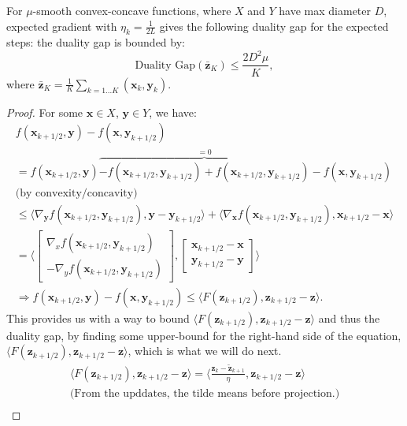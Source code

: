 \begin{proposition}
    \label{prop:proj_eg_smooth_convex_concave}
    For $\mu$-smooth convex-concave functions, where $X$ and $Y$ have max diameter $D$, expected gradient with $\eta_k = \frac{1}{2L}$ gives the following duality gap for the expected steps:
    the duality gap is bounded by:
    \[
        \text{Duality Gap}(\bar{\bm{z}}_K) \leq \frac{2 D^2 \mu}{K},
    \]
    where $\bar{\bm{z}}_K = \frac{1}{K} \sum_{k = 1...K} (\bm{x}_k,\bm{y}_k)$.
\end{proposition}


\begin{proof}
For some $\bm{x} \in X$, $\bm{y} \in Y$, we have:
\begin{align*}
    f(\bm{x}_{k+1/2},\bm{y}) - f(\bm{x},\bm{y}_{k+1/2}) \\
    = f(\bm{x}_{k+1/2},\bm{y}) \overbrace{- f(\bm{x}_{k+1/2},\bm{y}_{k+1/2}) + f(\bm{x}_{k+1/2},\bm{y}_{k+1/2})}^{=0}  - f(\bm{x},\bm{y}_{k+1/2}) \\
    \text{(by convexity/concavity)} \\
    \leq \langle \nabla_{\bm{y}} f(\bm{x}_{k+1/2},\bm{y}_{k+1/2}),\bm{y}- \bm{y}_{k+1/2} \rangle +
    \langle \nabla_{\bm{x}} f(\bm{x}_{k+1/2},\bm{y}_{k+1/2}), \bm{x}_{k+1/2} - \bm{x}\rangle  \\
    = 
    \Bigg \langle  
    \begin{bmatrix}
        \nabla_x f(\bm{x}_{k+1/2},\bm{y}_{k+1/2}) \\
        -\nabla_y f(\bm{x}_{k+1/2},\bm{y}_{k+1/2})
    \end{bmatrix} ,
    \begin{bmatrix}
        \bm{x}_{k+1/2} -\bm{x} \\ 
        \bm{y}_{k+1/2} - \bm{y}
    \end{bmatrix}
    \Bigg \rangle \\
    \Rightarrow f(\bm{x}_{k+1/2},\bm{y}) - f(\bm{x},\bm{y}_{k+1/2}) \leq 
    \langle F(\bm{z}_{k+1/2}), \bm{z}_{k+1/2} -\bm{z} \rangle.
\end{align*}
This provides us with a way to bound $\langle F(\bm{z}_{k+1/2}), \bm{z}_{k+1/2} -\bm{z} \rangle$ and thus the duality gap, by finding some upper-bound for the right-hand side of the equation, $\langle F(\bm{z}_{k+1/2}), \bm{z}_{k+1/2} -\bm{z} \rangle$, which is what we will do next.
\begin{align*}
    \langle F(\bm{z}_{k+1/2}), \bm{z}_{k+1/2} -\bm{z} \rangle
    = \Bigg \langle\frac{\bm{z}_k-\tilde{\bm{z}}_{k+1}}{\eta}, \bm{z}_{k+1/2} -\bm{z} \Bigg\rangle \\ \text{(From the upddates, the tilde means before projection.)} \\

\end{align*}
\end{proof}
